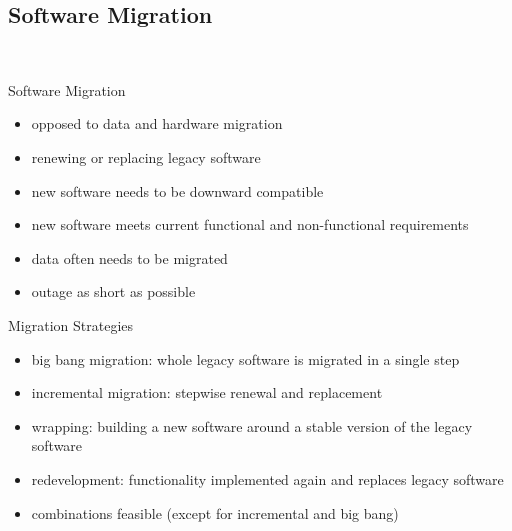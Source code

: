 \subsection{Software Migration}
\begin{frame}{\insertsubsection\ \mytitlesource{\ludewiglichter}}
	\begin{fancycolumns}
		\begin{definition}{Software Migration}
			\begin{itemize}
				\item opposed to data and hardware migration
				\item renewing or replacing legacy software
				\item new software needs to be downward compatible
				\item new software meets current functional and non-functional requirements
				\item data often needs to be migrated
				\item outage as short as possible
			\end{itemize}
		\end{definition}
		\nextcolumn
		\begin{note}{Migration Strategies}
			\begin{itemize}
				\item big bang migration: whole legacy software is migrated in a single step
				\item incremental migration: stepwise renewal and replacement
				\item wrapping: building a new software around a stable version of the legacy software
				\item redevelopment: functionality implemented again and replaces legacy software
				\item combinations feasible (except for incremental and big bang)
			\end{itemize}
		\end{note}
	\end{fancycolumns}
\end{frame}


